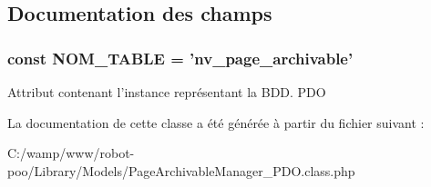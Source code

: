 \subsection{Documentation des champs}
\hypertarget{class_library_1_1_models_1_1_page_archivable_manager___p_d_o_a243755033f10b0817aa9d990cc252817}{
\subsubsection[{N\+O\+M\+\_\+\+T\+A\+B\+L\+E}]{\setlength{\rightskip}{0pt plus 5cm}const N\+O\+M\+\_\+\+T\+A\+B\+L\+E = 'nv\+\_\+page\+\_\+archivable'}}\label{class_library_1_1_models_1_1_page_archivable_manager___p_d_o_a243755033f10b0817aa9d990cc252817}
Attribut contenant l'instance représentant la B\+D\+D.  P\+D\+O 

La documentation de cette classe a été générée à partir du fichier suivant \+:\begin{DoxyCompactItemize}
\item 
C\+:/wamp/www/robot-\/poo/\+Library/\+Models/Page\+Archivable\+Manager\+\_\+\+P\+D\+O.\+class.\+php\end{DoxyCompactItemize}
